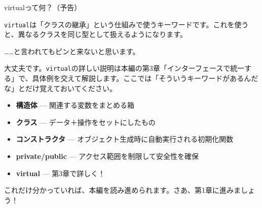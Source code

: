 \begin{qabox}{virtualって何？（予告）}

\texttt{virtual}は「クラスの継承」という仕組みで使うキーワードです。これを使うと、異なるクラスを同じ型として扱えるようになります。

……と言われてもピンと来ないと思います。

大丈夫です。\texttt{virtual}の詳しい説明は本編の第3章「インターフェースで統一する」で、具体例を交えて解説します。ここでは「そういうキーワードがあるんだな」とだけ覚えておいてください。

\begin{notebox}[ここまでのまとめ]
\begin{itemize}
  \item \textbf{構造体} — 関連する変数をまとめる箱
  \item \textbf{クラス} — データ＋操作をセットにしたもの
  \item \textbf{コンストラクタ} — オブジェクト生成時に自動実行される初期化関数
  \item \textbf{private/public} — アクセス範囲を制限して安全性を確保
  \item \textbf{virtual} — 第3章で詳しく！
\end{itemize}
\end{notebox}

これだけ分かっていれば、本編を読み進められます。さあ、第1章に進みましょう！

\end{qabox}
